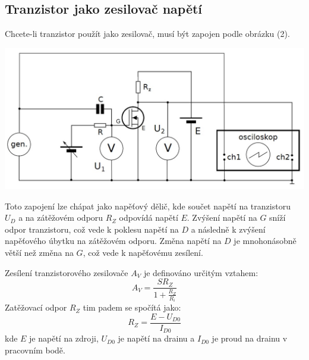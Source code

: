 \documentclass[a4paper,11pt]{article}
\begin{document}
\newpage
    \begin{minipage}[t]{0.5\textwidth} 
            \subsection{Tranzistor jako zesilovač napětí}
                Chcete-li tranzistor použít jako zesilovač, musí být zapojen podle obrázku (2). 
                \vspace{10pt}
                \par \centering
                \includegraphics[scale=0.25]{zas}
                \captionsetup{justification=centering, font=footnotesize}
                \label{fig:zas}
                \raggedright
                \vspace{10pt}
                Toto zapojení lze chápat jako napěťový dělič, kde součet napětí na tranzistoru $U_D$ a na zátěžovém odporu $R_Z$ odpovídá napětí $E$. Zvýšení napětí na $G$ sníží odpor tranzistoru, což vede k poklesu napětí na $D$ a následně k zvýšení napěťového úbytku na zátěžovém odporu. Změna napětí na $D$ je mnohonásobně větší než změna na $G$, což vede k napěťovému zesílení. 
                \par Zesílení tranzistorového zesilovače $A_V$ je definováno určitým vztahem:
                \begin{equation}
                    A_V = \frac{SR_Z}{1+\frac{R_Z}{R_i}}
                \end{equation}
                Zatěžovací odpor $R_Z$ tim padem se spočítá jako:
                \begin{equation}
                    R_Z = \frac{E - U_{D0}}{I_{D0}}
                \end{equation}
                kde $E$ je napětí na zdroji, $U_{D0}$ je napětí na drainu a $I_{D0}$ je proud na drainu v pracovním bodě.

\end{minipage}
\end{document}
